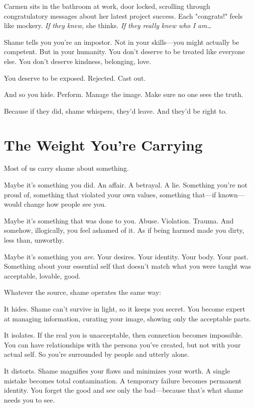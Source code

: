 \documentclass[11pt,twoside]{book}
\begin{document}
Carmen sits in the bathroom at work, door locked, scrolling through congratulatory messages about her latest project success. Each "congrats!" feels like mockery. \emph{If they knew,} she thinks. \emph{If they really knew who I am\ldots{}}

Shame tells you you're an impostor. Not in your skills—you might actually be competent. But in your humanity. You don't deserve to be treated like everyone else. You don't deserve kindness, belonging, love.

You deserve to be exposed. Rejected. Cast out.

And so you hide. Perform. Manage the image. Make sure no one sees the truth.

Because if they did, shame whispers, they'd leave. And they'd be right to.

\section*{The Weight You're Carrying}

Most of us carry shame about something.

Maybe it's something you did. An affair. A betrayal. A lie. Something you're not proud of, something that violated your own values, something that—if known—would change how people see you.

Maybe it's something that was done to you. Abuse. Violation. Trauma. And somehow, illogically, you feel ashamed of it. As if being harmed made you dirty, less than, unworthy.

Maybe it's something you \emph{are}. Your desires. Your identity. Your body. Your past. Something about your essential self that doesn't match what you were taught was acceptable, lovable, good.

Whatever the source, shame operates the same way:

It hides. Shame can't survive in light, so it keeps you secret. You become expert at managing information, curating your image, showing only the acceptable parts.

It isolates. If the real you is unacceptable, then connection becomes impossible. You can have relationships with the persona you've created, but not with your actual self. So you're surrounded by people and utterly alone.

It distorts. Shame magnifies your flaws and minimizes your worth. A single mistake becomes total contamination. A temporary failure becomes permanent identity. You forget the good and see only the bad—because that's what shame needs you to see.
\end{document}
